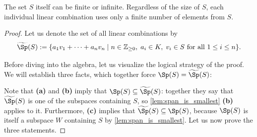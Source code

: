 \begin{remark}
\label{rem:S_finite_or_infinite}
The set $S$ itself can be finite or infinite. Regardless of the size of $S$, each individual linear combination uses only a finite number of elements from $S$.
\end{remark}

\begin{proof}
Let us denote the set of all linear combinations by
\[
\widetilde{\Sp}(S) := \{a_1 v_1 + \dots + a_n v_n \mid n \in \mathbb{Z}_{\ge 0}, \; a_i \in K, \; v_i \in S \text{ for all } 1 \le i \le n\}.
\]

Before diving into the algebra, let us visualize the logical strategy of the proof. We will establish three facts, which together force $\Sp(S) = \widetilde{\Sp}(S)$:

\begin{center}
\end{center}

Note that \textbf{(a)} and \textbf{(b)} imply that $\Sp(S) \subseteq \widetilde{\Sp}(S)$: together they say that $\widetilde{\Sp}(S)$ is one of the subspaces containing $S$, so \cref{lem:span_is_smallest} \textbf{(b)} applies to it. Furthermore, \textbf{(c)} implies that $\widetilde{\Sp}(S) \subseteq \Sp(S)$, because $\Sp(S)$ is itself a subspace $W$ containing $S$ by \cref{lem:span_is_smallest}. Let us now prove the three statements.


\end{proof}
